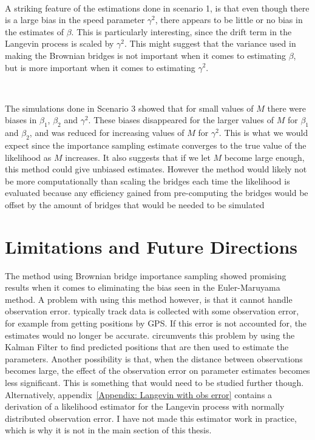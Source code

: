 \

A striking feature of the estimations done in scenario 1, is that even though there is a large bias in the speed parameter $\gamma^2$, there appears to be little or no bias in the estimates of $\beta$. This is particularly interesting, since the drift term in the Langevin process is scaled by $\gamma^2$. This might suggest that the variance used in making the Brownian bridges is not important when it comes to estimating $\beta$, but is more important when it comes to estimating $\gamma^2$.

\


The simulations done in Scenario 3 showed that for small values of $M$ there were biases in $\beta_1$, $\beta_2$ and $\gamma^2$. These biases disappeared for the larger values of $M$ for $\beta_1$ and $\beta_2$, and was reduced for increasing values of $M$ for $\gamma^2$. This is what we would expect since the importance sampling estimate converges to the true value of the likelihood as $M$ increases. It also suggests that if we let $M$ become large enough, this method could give unbiased estimates. However the method would likely not be more computationally than scaling the bridges each time the likelihood is evaluated because any efficiency gained from pre-computing the bridges would be offset by the amount of bridges that would be needed to be simulated



\section{Limitations and Future Directions}
The method using Brownian bridge importance sampling showed promising results when it comes to eliminating the bias seen in the Euler-Maruyama method. A problem with using this method however, is that it cannot handle observation error. typically track data is collected with some observation error, for example from getting positions by GPS. If this error is not accounted for, the estimates would no longer be accurate. \parencite{michelot_langevin_2019} circumvents this problem by using the Kalman Filter to find predicted positions that are then used to estimate the parameters. Another possibility is that, when the distance between observations becomes large, the effect of the observation error on parameter estimates becomes less significant. This is something that would need to be studied further though. Alternatively, appendix~\ref{Appendix: Langevin with obs error} contains a derivation of a likelihood estimator for the Langevin process with normally distributed observation error. I have not made this estimator work in practice, which is why it is not in the main section of this thesis.

